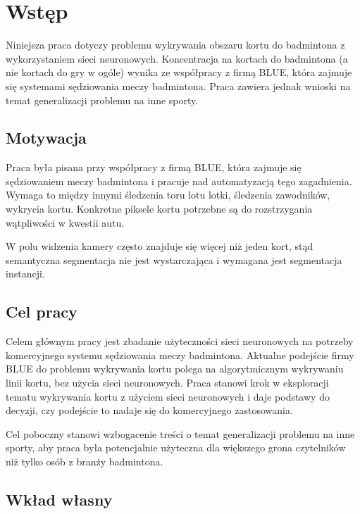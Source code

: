 \chapter{Wstęp}

Niniejsza praca dotyczy problemu wykrywania obszaru kortu do badmintona z wykorzystaniem sieci neuronowych.
Koncentracja na kortach do badmintona (a nie kortach do gry w ogóle) wynika ze współpracy z firmą BLUE, która zajmuje się systemami sędziowania meczy badmintona. Praca zawiera jednak wnioski na temat generalizacji problemu na inne sporty.

\section{Motywacja}

Praca była pisana przy współpracy z firmą BLUE, która zajmuje się sędziowaniem meczy badmintona i pracuje nad automatyzacją tego zagadnienia. Wymaga to między innymi śledzenia toru lotu lotki, śledzenia zawodników, wykrycia kortu. Konkretne piksele kortu potrzebne są do rozstrzygania wątpliwości w kwestii autu.

W polu widzenia kamery często znajduje się więcej niż jeden kort, stąd semantyczna segmentacja nie jest wystarczająca i wymagana jest segmentacja instancji.

\section{Cel pracy}

Celem głównym pracy jest zbadanie użyteczności sieci neuronowych na potrzeby komercyjnego systemu sędziowania meczy badmintona. Aktualne podejście firmy BLUE do problemu wykrywania kortu polega na algorytmicznym wykrywaniu linii kortu, bez użycia sieci neuronowych. Praca stanowi krok w eksploracji tematu wykrywania kortu z użyciem sieci neuronowych i daje podstawy do decyzji, czy podejście to nadaje się do komercyjnego zastosowania.

Cel poboczny stanowi wzbogacenie treści o temat generalizacji problemu na inne sporty, aby praca była potencjalnie użyteczna dla większego grona czytelników niż tylko osób z branży badmintona.


\section{Wkład własny}

